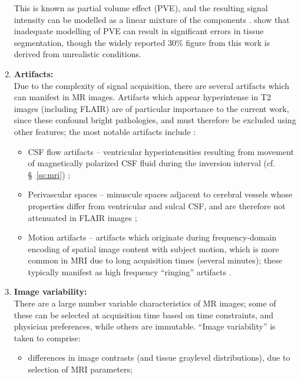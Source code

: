\begin{enumerate}[itemsep=0pt,topsep=0pt]
    This is known as partial volume effect (PVE), and the resulting signal intensity can be modelled as a linear mixture of the components \cite{Santago1995}.
    \citeauthor{Niessen1999} \cite{Niessen1999} show that inadequate modelling of PVE can result in significant errors in tissue segmentation, though the widely reported 30\% figure from this work is derived from unrealistic conditions.
  \item \label{chauto:artifacts} 
  \textbf{Artifacts:} \\
    Due to the complexity of signal acquisition, there are several artifacts which can manifest in MR images.
    Artifacts which appear hyperintense in T2 images (including FLAIR) are of particular importance to the current work, since these confound bright pathologies, and must therefore be excluded using other features; the most notable artifacts include \cite{Wardlaw2015}:
    \begin{itemize}[itemsep=0pt,topsep=0pt]
      \item CSF flow artifacts -- ventricular hyperintensities resulting from movement of magnetically polarized CSF fluid during the inversion interval (cf. \S\ \ref{ss:mri}) \cite{Bakshi2000};
      \item Perivascular spaces -- minuscule spaces adjacent to cerebral vessels whose properties differ from ventricular and sulcal CSF, and are therefore not attenuated in FLAIR images \cite{Wardlaw2015};
      \item Motion artifacts -- artifacts which originate during frequency-domain encoding of spatial image content with subject motion, which is more common in MRI due to long acquisition times (several minutes); these typically manifest as high frequency ``ringing'' artifacts \cite{Zaitsev2015}.
    \end{itemize}
  \item \label{chauto:variability}
  \textbf{Image variability:} \\
    There are a large number variable characteristics of MR images; some of these can be selected at acquisition time based on time constraints, and physician preferences, while others are immutable.
    ``Image variability'' is taken to comprise:
    \begin{itemize}[itemsep=0pt,topsep=0pt]
      \item differences in image contrasts (and tissue graylevel distributions), due to selection of MRI parameters;

\end{itemize}
\end{enumerate}
